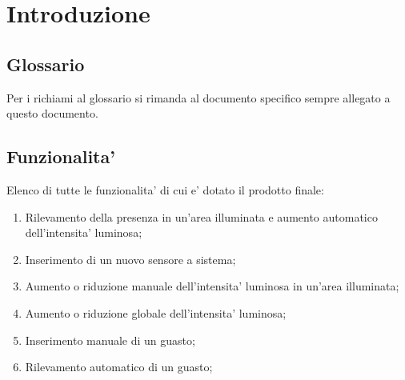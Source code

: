 \chapter{Introduzione}

\section{Glossario}

Per i richiami al glossario si rimanda al documento specifico sempre allegato a questo documento.

\section{Funzionalita'}
Elenco di tutte le funzionalita' di cui e' dotato il prodotto finale:
\begin{enumerate}
    \item Rilevamento della presenza in un’area illuminata e aumento automatico dell’intensita' luminosa;
    \item Inserimento di un nuovo sensore a sistema;
    \item Aumento o riduzione manuale dell’intensita' luminosa in un’area illuminata;
    \item Aumento o riduzione globale dell’intensita' luminosa;
    \item Inserimento manuale di un guasto;
    \item Rilevamento automatico di un guasto;
\end{enumerate}